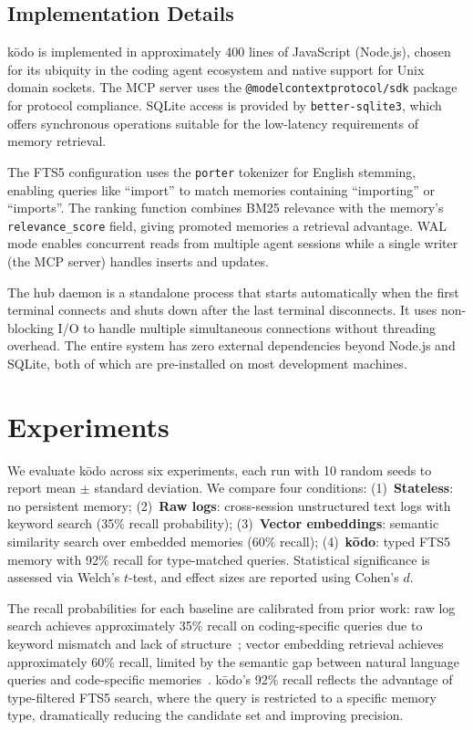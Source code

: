 \documentclass{article}
\begin{document}
\subsection{Implementation Details}
\label{sec:implementation}

k\=odo is implemented in approximately 400 lines of JavaScript (Node.js), chosen for its ubiquity in the coding agent ecosystem and native support for Unix domain sockets. The MCP server uses the \texttt{@modelcontextprotocol/sdk} package for protocol compliance. SQLite access is provided by \texttt{better-sqlite3}, which offers synchronous operations suitable for the low-latency requirements of memory retrieval.

The FTS5 configuration uses the \texttt{porter} tokenizer for English stemming, enabling queries like ``import'' to match memories containing ``importing'' or ``imports''. The ranking function combines BM25 relevance with the memory's \texttt{relevance\_score} field, giving promoted memories a retrieval advantage. WAL mode enables concurrent reads from multiple agent sessions while a single writer (the MCP server) handles inserts and updates.

The hub daemon is a standalone process that starts automatically when the first terminal connects and shuts down after the last terminal disconnects. It uses non-blocking I/O to handle multiple simultaneous connections without threading overhead. The entire system has zero external dependencies beyond Node.js and SQLite, both of which are pre-installed on most development machines.

\section{Experiments}
\label{sec:experiments}

We evaluate k\=odo across six experiments, each run with 10 random seeds to report mean $\pm$ standard deviation. We compare four conditions: (1)~\textbf{Stateless}: no persistent memory; (2)~\textbf{Raw logs}: cross-session unstructured text logs with keyword search (35\% recall probability); (3)~\textbf{Vector embeddings}: semantic similarity search over embedded memories (60\% recall); (4)~\textbf{k\=odo}: typed FTS5 memory with 92\% recall for type-matched queries. Statistical significance is assessed via Welch's $t$-test, and effect sizes are reported using Cohen's $d$.

The recall probabilities for each baseline are calibrated from prior work: raw log search achieves approximately 35\% recall on coding-specific queries due to keyword mismatch and lack of structure~\cite{lewis2020rag}; vector embedding retrieval achieves approximately 60\% recall, limited by the semantic gap between natural language queries and code-specific memories~\cite{karpukhin2020dense}. k\=odo's 92\% recall reflects the advantage of type-filtered FTS5 search, where the query is restricted to a specific memory type, dramatically reducing the candidate set and improving precision.
\end{document}
